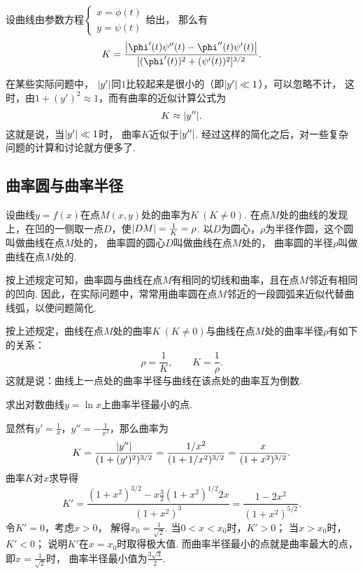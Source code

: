 设曲线由参数方程\(\left\{ \begin{array}{c}
	x = \phi(t) \\
	y = \psi(t)
\end{array} \right.\)给出，
那么有\begin{equation}
	K = \frac{
		\abs{\phi'(t)\psi''(t)-\phi''(t)\psi'(t)}
	}{
		[(\phi'(t))^2+(\psi'(t))^2]^{3/2}
	}.
\end{equation}

在某些实际问题中，
\(\abs{y'}\)同\(1\)比较起来是很小的（即\(\abs{y'} \ll 1\)），可以忽略不计，
这时，由\(1 + (y')^2 \approx 1\)，而有曲率的近似计算公式为\[
	K \approx \abs{y''}.
\]
这就是说，当\(\abs{y'} \ll 1\)时，
曲率\(K\)近似于\(\abs{y''}\).
经过这样的简化之后，对一些复杂问题的计算和讨论就方便多了.

\subsection{曲率圆与曲率半径}
设曲线\(y=f(x)\)在点\(M(x,y)\)处的曲率为\(K\ (K\neq0)\).
在点\(M\)处的曲线的发现上，在凹的一侧取一点\(D\)，使\(\abs{DM} = \frac{1}{K} = \rho\).
以\(D\)为圆心，\(\rho\)为半径作圆，这个圆叫做曲线在点\(M\)处的，
曲率圆的圆心\(D\)叫做曲线在点\(M\)处的，
曲率圆的半径\(\rho\)叫做曲线在点\(M\)处的.

按上述规定可知，曲率圆与曲线在点\(M\)有相同的切线和曲率，且在点\(M\)邻近有相同的凹向.
因此，在实际问题中，常常用曲率圆在点\(M\)邻近的一段圆弧来近似代替曲线弧，以使问题简化.

按上述规定，曲线在点\(M\)处的曲率\(K\ (K\neq0)\)与曲线在点\(M\)处的曲率半径\(\rho\)有如下的关系：\[
	\rho = \frac{1}{K}, \qquad K = \frac{1}{\rho}.
\]
这就是说：曲线上一点处的曲率半径与曲线在该点处的曲率互为倒数.

\begin{example}
求出对数曲线\(y = \ln x\)上曲率半径最小的点.
\begin{solution}
显然有\(y' = \frac{1}{x}\)，\(y'' = -\frac{1}{x^2}\)，那么曲率为\[
	K = \frac{\abs{y''}}{(1+(y')^2)^{3/2}}
	= \frac{1/x^2}{(1+1/x^2)^{3/2}}
	= \frac{x}{(1+x^2)^{3/2}}.
\]
曲率\(K\)对\(x\)求导得\[
	K' = \frac{(1+x^2)^{3/2} - x \frac{3}{2} (1+x^2)^{1/2} 2x}{(1+x^2)^3}
	= \frac{1 - 2x^2}{(1+x^2)^{5/2}}.
\]
令\(K' = 0\)，考虑\(x>0\)，
解得\(x_0 = \frac{1}{\sqrt{2}}\).
当\(0<x<x_0\)时，\(K'>0\)；
当\(x>x_0\)时，\(K'<0\)；
说明\(K'\)在\(x=x_0\)时取得极大值.
而曲率半径最小的点就是曲率最大的点，
即\(x = \frac{1}{\sqrt{2}}\)时，
曲率半径最小值为\(\frac{3\sqrt{3}}{2}\).
\end{solution}
\end{example}

